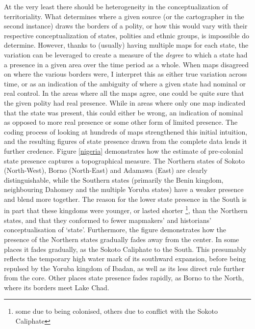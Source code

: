 \documentclass[12pt]{article}
\begin{document}
At the very least there should be heterogeneity in the conceptualization of
territoriality. What determines where a given source (or the cartographer in the
second instance) draws the borders of a polity, or how this would vary with
their respective conceptualization of states, polities and ethnic groups, is
impossible do determine. However, thanks to (usually) having multiple maps for
each state, the variation can be leveraged to create a measure of the
\textit{degree} to which a state had a presence in a given area over the time
period as a whole. When maps disagreed on where the various borders were, I
interpret this as either true variation across time, or as an indication of the
ambiguity of where a given state had nominal or real control. In the areas where
all the maps agree, one could be quite sure that the given polity had real
presence.  While in areas where only one map indicated that the state was
present, this could either be wrong, an indication of nominal as opposed to more
real presence or some other form of limited presence. The coding process of
looking at hundreds of maps strengthened this initial intuition, and the
resulting figures of state presence drawn from the complete data lends it
further credence. Figure \ref{nigeria} demonstrates how the estimate of
pre-colonial state presence captures a topographical measure. The Northern
states of Sokoto (North-West), Borno (North-East) and Adamawa (East) are clearly
distinguishable, while the Southern states (primarily the Benin kingdom,
neighbouring Dahomey and the multiple Yoruba states) have a weaker presence and
blend more together. The reason for the lower state presence in the South is in
part that these kingdoms were younger, or lasted shorter \footnote{some due to
being colonised, others due to conflict with the Sokoto Caliphate}, than the
Northern states, and that they conformed to fewer mapmakers' and historians'
conceptualisation of `state'. Furthermore, the figure demonstrates how the
presence of the Northern states gradually fades away from the center. In some
places it fades gradually, as the Sokoto Caliphate to the South. This presumably
reflects the temporary high water mark of its southward expansion, before being
repulsed by the Yoruba kingdom of Ibadan, as well as its less direct rule
further from the core. Other places state presence fades rapidly, as Borno to
the North, where its borders meet Lake Chad.

\end{document}
